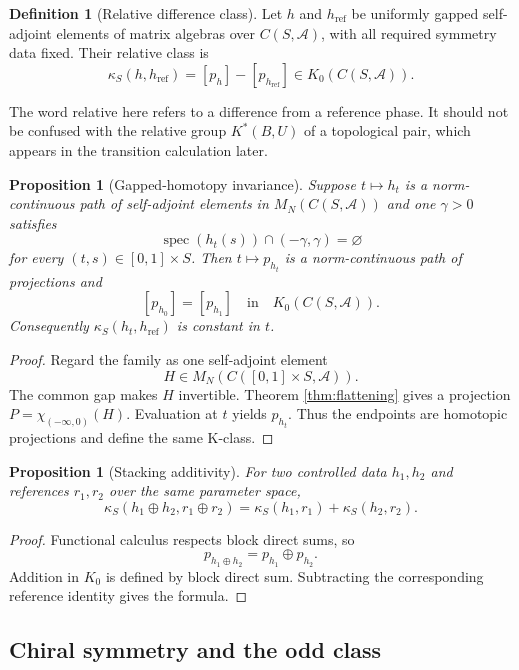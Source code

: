 \documentclass[12pt]{article}
\newtheorem{proposition}[theorem]{Proposition}
\theoremstyle{definition}
\newtheorem{definition}[theorem]{Definition}
\theoremstyle{remark}
\newcommand{\A}{\mathcal A}
\newcommand{\spec}{\operatorname{spec}}
\begin{document}
\begin{definition}[Relative difference class]
Let $h$ and $h_{\mathrm{ref}}$ be uniformly gapped self-adjoint elements of
matrix algebras over $C(S,\A)$, with all required symmetry data fixed.
Their relative class is
\[
\kappa_S(h,h_{\mathrm{ref}})
=
[p_h]-[p_{h_{\mathrm{ref}}}]
\in K_0(C(S,\A)).
\]
\end{definition}

The word relative here refers to a difference from a reference phase.
It should not be confused with the relative group $K^*(B,U)$ of a topological
pair, which appears in the transition calculation later.

\begin{proposition}[Gapped-homotopy invariance]
\label{prop:homotopy-invariance}
Suppose $t\mapsto h_t$ is a norm-continuous path of self-adjoint elements in
$M_N(C(S,\A))$ and one $\gamma>0$ satisfies
\[
\spec(h_t(s))\cap(-\gamma,\gamma)=\varnothing
\]
for every $(t,s)\in[0,1]\times S$.
Then $t\mapsto p_{h_t}$ is a norm-continuous path of projections and
\[
[p_{h_0}]=[p_{h_1}]
\quad\text{in}\quad K_0(C(S,\A)).
\]
Consequently $\kappa_S(h_t,h_{\mathrm{ref}})$ is constant in $t$.
\end{proposition}

\begin{proof}
Regard the family as one self-adjoint element
\[
H\in M_N(C([0,1]\times S,\A)).
\]
The common gap makes $H$ invertible.
Theorem \ref{thm:flattening} gives a projection
$P=\chi_{(-\infty,0)}(H)$.
Evaluation at $t$ yields $p_{h_t}$.
Thus the endpoints are homotopic projections and define the same K-class.
\end{proof}

\begin{proposition}[Stacking additivity]
\label{prop:stacking}
For two controlled data $h_1,h_2$ and references
$r_1,r_2$ over the same parameter space,
\[
\kappa_S(h_1\oplus h_2,r_1\oplus r_2)
=
\kappa_S(h_1,r_1)+\kappa_S(h_2,r_2).
\]
\end{proposition}

\begin{proof}
Functional calculus respects block direct sums, so
\[
p_{h_1\oplus h_2}=p_{h_1}\oplus p_{h_2}.
\]
Addition in $K_0$ is defined by block direct sum.
Subtracting the corresponding reference identity gives the formula.
\end{proof}

\subsection{Chiral symmetry and the odd class}
\end{document}
